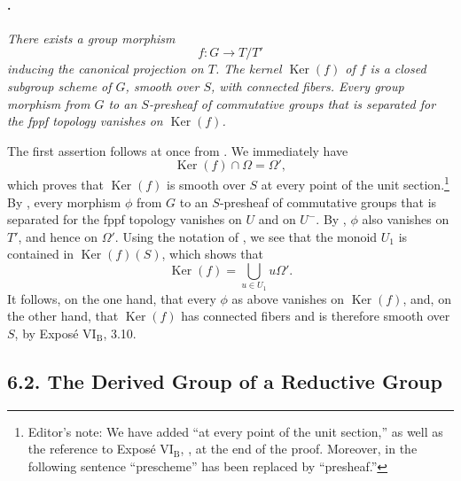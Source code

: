 \paragraph{.}
\textit{There exists a group morphism}
\[
  f:G\longrightarrow T/T'
\]
\textit{inducing the canonical projection on \(T\). The kernel
\(\operatorname{Ker}(f)\) of \(f\) is a closed subgroup scheme of
\(G\), smooth over \(S\), with connected fibers. Every group
morphism from \(G\) to an \(S\)-presheaf of commutative groups
that is separated for the fppf topology vanishes on
\(\operatorname{Ker}(f)\).}

The first assertion follows at once from . We immediately
have
\[
  \operatorname{Ker}(f)\cap\Omega=\Omega',
\]
which proves that \(\operatorname{Ker}(f)\) is smooth over \(S\)
at every point of the unit section.\footnote{Editor's note: We have
added ``at every point of the unit section,'' as well as the
reference to Exposé \(\mathrm{VI_B}\), , at the end of the
proof. Moreover, in the following sentence ``prescheme'' has been
replaced by ``presheaf.''}
By \textup{}, every morphism
\(\phi\) from \(G\) to an \(S\)-presheaf of commutative groups
that is separated for the fppf topology vanishes on \(U\) and on
\(U^-\). By , \(\phi\) also vanishes on \(T'\), and
hence on \(\Omega'\). Using the notation of , we see that the
monoid \(U_1\) is contained in \(\operatorname{Ker}(f)(S)\), which
shows that
\[
  \operatorname{Ker}(f)
  =
  \bigcup_{u\in U_1}u\Omega'.
\]
It follows, on the one hand, that every \(\phi\) as above vanishes
on \(\operatorname{Ker}(f)\), and, on the other hand, that
\(\operatorname{Ker}(f)\) has connected fibers and is therefore
smooth over \(S\), by Exposé \(\mathrm{VI_B}\), 3.10.

\subsection*{6.2. The Derived Group of a Reductive Group}

